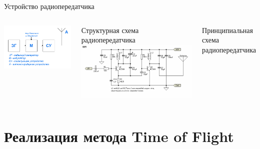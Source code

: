 \begin{frame}{Устройство радиопередатчика}
    \begin{columns}
        \centering
        \includegraphics[width=1\linewidth]{../Figures/radiostruct.jpg}

        Структурная схема радиопередатчика
        \centering
        \includegraphics[width=1\linewidth]{../Figures/rfcircuit.png}

        Принципиальная схема радиопередатчика
    \end{columns}
\end{frame}

\section{Реализация метода Time of Flight}

